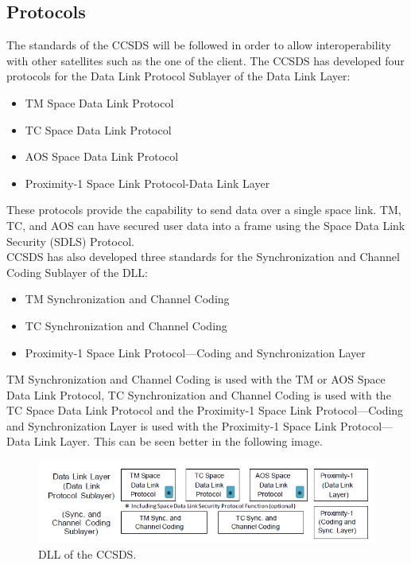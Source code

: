 \subsection{Protocols}
The standards of the CCSDS will be followed in order to allow interoperability with other satellites such as the one of the client. The CCSDS has developed four protocols for the Data Link Protocol Sublayer of the Data Link Layer\cite{Secretariat2014}:
\begin{itemize}
\item TM Space Data Link Protocol
\item TC Space Data Link Protocol
\item AOS Space Data Link Protocol
\item Proximity-1 Space Link Protocol-Data Link Layer
\end{itemize}
These protocols provide the capability to send data over a single space link. TM, TC, and AOS can have secured user data into a frame using the Space Data Link Security (SDLS) Protocol.\\
 CCSDS has also developed three standards for the Synchronization and Channel Coding Sublayer of the DLL:
 \begin{itemize}
 \item TM Synchronization and Channel Coding
 \item TC Synchronization and Channel Coding
 \item Proximity-1 Space Link Protocol—Coding and Synchronization Layer
 \end{itemize}
TM Synchronization and Channel Coding is used with the TM or AOS Space Data Link
Protocol, TC Synchronization and Channel Coding is used with the TC Space Data Link Protocol and the Proximity-1 Space Link Protocol—Coding and Synchronization Layer is
used with the Proximity-1 Space Link Protocol—Data Link Layer. This can be seen better in the following image.\\
\begin{figure}[H]
\begin{center}
\includegraphics[scale=0.9]{DLLCCSDS.PNG}   
\caption{DLL of the CCSDS.}
\end{center}
\end{figure}
